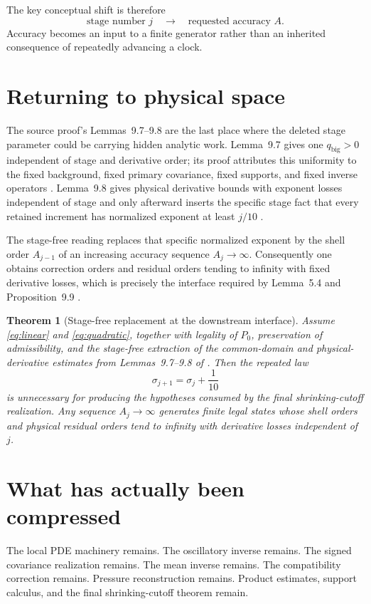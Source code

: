 \documentclass[11pt]{article}
\numberwithin{equation}{section}
\theoremstyle{highend}
\newtheorem{theorem}{Theorem}[section]
\theoremstyle{definition}
\begin{document}
The key conceptual shift is therefore
\[
\boxed{\text{stage number }j\quad\longrightarrow\quad\text{requested accuracy }A.}
\]
Accuracy becomes an input to a finite generator rather than an inherited consequence of repeatedly advancing a clock.

\section{Returning to physical space}
The source proof's Lemmas~9.7--9.8 are the last place where the deleted stage parameter could be carrying hidden analytic work. Lemma~9.7 gives one $q_{\mathrm{big}}>0$ independent of stage and derivative order; its proof attributes this uniformity to the fixed background, fixed primary covariance, fixed supports, and fixed inverse operators \cite[pp.~111--113]{OpenAI2026NS}. Lemma~9.8 gives physical derivative bounds with exponent losses independent of stage and only afterward inserts the specific stage fact that every retained increment has normalized exponent at least $j/10$ \cite[pp.~113--114]{OpenAI2026NS}.

The stage-free reading replaces that specific normalized exponent by the shell order $A_{j-1}$ of an increasing accuracy sequence $A_j\to\infty$. Consequently one obtains correction orders and residual orders tending to infinity with fixed derivative losses, which is precisely the interface required by Lemma~5.4 and Proposition~9.9 \cite[pp.~56--61,114--115]{OpenAI2026NS}.

\begin{theorem}[Stage-free replacement at the downstream interface]\label{thm:replacement}
Assume \eqref{eq:linear} and \eqref{eq:quadratic}, together with legality of $P_0$, preservation of admissibility, and the stage-free extraction of the common-domain and physical-derivative estimates from Lemmas~9.7--9.8 of \cite{OpenAI2026NS}. Then the repeated law
\[
\sigma_{j+1}=\sigma_j+\frac1{10}
\]
is unnecessary for producing the hypotheses consumed by the final shrinking-cutoff realization. Any sequence $A_j\to\infty$ generates finite legal states whose shell orders and physical residual orders tend to infinity with derivative losses independent of $j$.
\end{theorem}

\section{What has actually been compressed}
The local PDE machinery remains. The oscillatory inverse remains. The signed covariance realization remains. The mean inverse remains. The compatibility correction remains. Pressure reconstruction remains. Product estimates, support calculus, and the final shrinking-cutoff theorem remain.
\end{document}
